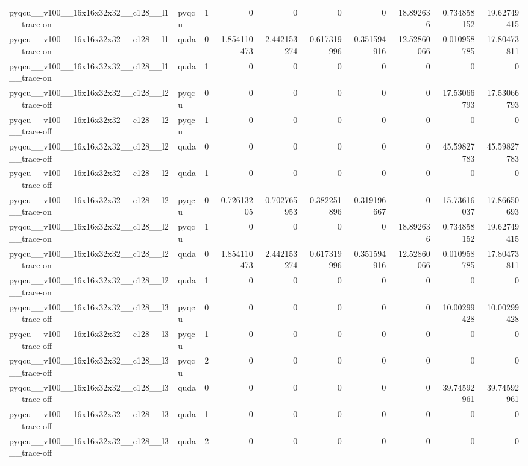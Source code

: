 \begin{table}[htbp]
\begin{tabular}{@{}llrrrrrrrr@{}}
pyqcu\_\_v100\_\_16x16x32x32\_\_c128\_\_l1\_\_trace-on & pyqcu & 1 & 0 & 0 & 0 & 0 & 18.892636 & 0.734858152 & 19.62749415 \\
pyqcu\_\_v100\_\_16x16x32x32\_\_c128\_\_l1\_\_trace-on & quda & 0 & 1.854110473 & 2.442153274 & 0.617319996 & 0.351594916 & 12.52860066 & 0.010958785 & 17.80473811 \\
pyqcu\_\_v100\_\_16x16x32x32\_\_c128\_\_l1\_\_trace-on & quda & 1 & 0 & 0 & 0 & 0 & 0 & 0 & 0 \\
pyqcu\_\_v100\_\_16x16x32x32\_\_c128\_\_l2\_\_trace-off & pyqcu & 0 & 0 & 0 & 0 & 0 & 0 & 17.53066793 & 17.53066793 \\
pyqcu\_\_v100\_\_16x16x32x32\_\_c128\_\_l2\_\_trace-off & pyqcu & 1 & 0 & 0 & 0 & 0 & 0 & 0 & 0 \\
pyqcu\_\_v100\_\_16x16x32x32\_\_c128\_\_l2\_\_trace-off & quda & 0 & 0 & 0 & 0 & 0 & 0 & 45.59827783 & 45.59827783 \\
pyqcu\_\_v100\_\_16x16x32x32\_\_c128\_\_l2\_\_trace-off & quda & 1 & 0 & 0 & 0 & 0 & 0 & 0 & 0 \\
pyqcu\_\_v100\_\_16x16x32x32\_\_c128\_\_l2\_\_trace-on & pyqcu & 0 & 0.72613205 & 0.702765953 & 0.382251896 & 0.319196667 & 0 & 15.73616037 & 17.86650693 \\
pyqcu\_\_v100\_\_16x16x32x32\_\_c128\_\_l2\_\_trace-on & pyqcu & 1 & 0 & 0 & 0 & 0 & 18.892636 & 0.734858152 & 19.62749415 \\
pyqcu\_\_v100\_\_16x16x32x32\_\_c128\_\_l2\_\_trace-on & quda & 0 & 1.854110473 & 2.442153274 & 0.617319996 & 0.351594916 & 12.52860066 & 0.010958785 & 17.80473811 \\
pyqcu\_\_v100\_\_16x16x32x32\_\_c128\_\_l2\_\_trace-on & quda & 1 & 0 & 0 & 0 & 0 & 0 & 0 & 0 \\
pyqcu\_\_v100\_\_16x16x32x32\_\_c128\_\_l3\_\_trace-off & pyqcu & 0 & 0 & 0 & 0 & 0 & 0 & 10.00299428 & 10.00299428 \\
pyqcu\_\_v100\_\_16x16x32x32\_\_c128\_\_l3\_\_trace-off & pyqcu & 1 & 0 & 0 & 0 & 0 & 0 & 0 & 0 \\
pyqcu\_\_v100\_\_16x16x32x32\_\_c128\_\_l3\_\_trace-off & pyqcu & 2 & 0 & 0 & 0 & 0 & 0 & 0 & 0 \\
pyqcu\_\_v100\_\_16x16x32x32\_\_c128\_\_l3\_\_trace-off & quda & 0 & 0 & 0 & 0 & 0 & 0 & 39.74592961 & 39.74592961 \\
pyqcu\_\_v100\_\_16x16x32x32\_\_c128\_\_l3\_\_trace-off & quda & 1 & 0 & 0 & 0 & 0 & 0 & 0 & 0 \\
pyqcu\_\_v100\_\_16x16x32x32\_\_c128\_\_l3\_\_trace-off & quda & 2 & 0 & 0 & 0 & 0 & 0 & 0 & 0 \\

\end{tabular}
\end{table}
